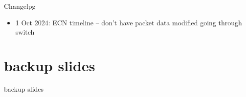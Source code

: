 \date{}
\title{}
\date{}
\usepackage{pgfplots}
\pgfplotsset{compat=1.16}

\begin{frame}
    \titlepage
\end{frame}

{\changelogmode
\begin{frame}{Changelpg}
\begin{itemize}
\item 1 Oct 2024: ECN timeline -- don't have packet data modified going through switch
\end{itemize}
\end{frame}
}





\section{backup slides}
\begin{frame}{backup slides}
\end{frame}




